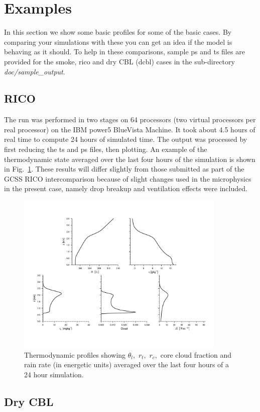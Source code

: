 \documentclass[11pt,a4paper]{article}
\begin{document}
\section{Examples}
In this section we show some basic profiles for some of the basic cases.
By comparing your simulations with these you can get an idea if the
model is behaving as it should. To help in these comparisons, sample
ps and ts files are provided for the smoke, rico and dry CBL (dcbl)
cases in the sub-directory \emph{doc/sample\_output}.

\subsection{RICO}
The run was performed in two stages on 64 processors
(two virtual processors per real processor) on the IBM
power5 BlueVista Machine. It took about 4.5 hours of real
time to compute 24 hours of simulated time.
The output was processed by first reducing the ts and ps files, then plotting.
An example of the thermodynamic state averaged over the last four hours
of the simulation is shown in Fig.~\ref{fig:rico}. These results will
differ slightly from those submitted as part of the GCSS RICO
intercomparison because of slight changes used in the microphysics in
the present case, namely drop breakup and ventilation effects were
included.

\begin{figure}
\centering \leavevmode 
\includegraphics[width=10cm]{rico}
\caption{Thermodynamic profiles showing $\theta_l,$ $r_t,$ $r_c,$ core
cloud fraction and rain rate (in energetic units) averaged over the
last four hours of a 24 hour simulation.}
\label{fig:rico}
\end{figure}

\subsection{Dry CBL}
\end{document}
